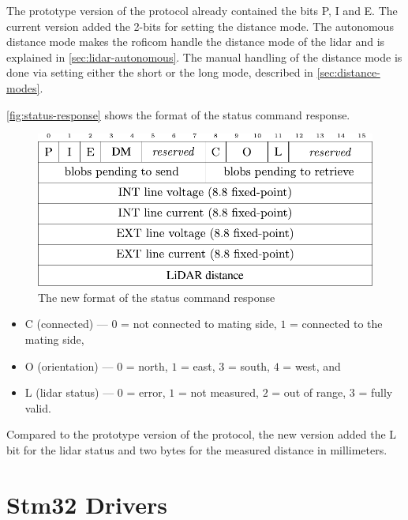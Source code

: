 \documentclass[
  digital,     %
  oneside,     %
  nosansbold,  %
  nocolorbold, %
  nolof,         %
  nolot,         %
]{fithesis4}
\newcommand{\TODO}[1]{#1} %
\newcommand{\TODOLIST}[1]{}
\begin{document}
The prototype version of the protocol already contained the bits P, I and E. The current version
added the 2-bits for setting the distance mode. The autonomous distance mode makes the
\acrshort{roficom} handle the distance mode of the \acrshort{lidar} and is explained in
\autoref{sec:lidar-autonomous}. The manual handling of the distance mode is done via setting either
the short or the long mode, described in \autoref{sec:distance-modes}.

\autoref{fig:status-response} shows the format of the status command response.

\begin{figure}
    \includegraphics[width=\textwidth,height=\textheight,keepaspectratio]{assets/status_response_new.pdf}
    \caption[Status command response]{The new format of the status command response}
    \label{fig:status-response}
\end{figure}

\begin{itemize}
    \item C (connected) --- $0$ = not connected to mating side, $1$ = connected to the mating side,
    \item O (orientation) --- $0$ = north, $1$ = east, $3$ = south, $4$ = west, and
    \item L (\acrshort{lidar} status) --- $0$ = error, $1$ = not measured, $2$ = out of range, $3$ = fully valid.
\end{itemize}

Compared to the prototype version of the protocol, the new version added the L bit for the
\acrshort{lidar} status and two bytes for the measured distance in millimeters.

\section{ Stm32 Drivers }
\TODOLIST{
\begin{itemize}
    \item already implemented
    \item port files --- portability
    \item to implement --- \acrshort{i2c}
\end{itemize}
}
\end{document}
